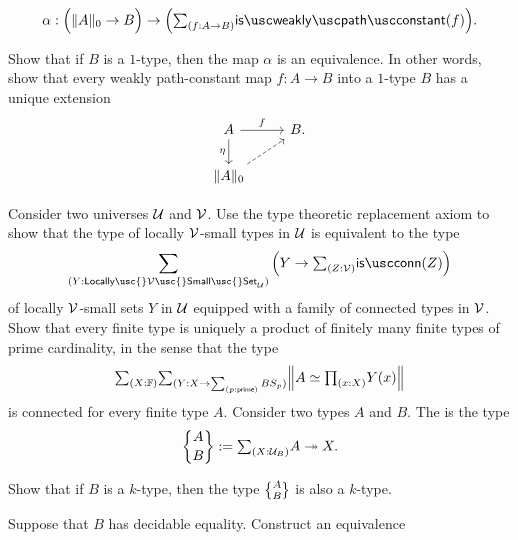 \begin{exercises}
\begin{subexenum}
    \begin{equation*}
      \alpha : \Big(\trunc{0}{A}\to B\Big)\to\Big(\sm{f:A\to B}\isweaklypathconstant(f)\Big).
    \end{equation*}
  \item Show that if $B$ is a $1$-type, then the map $\alpha$ is an equivalence. In other words, show that every weakly path-constant map $f:A\to B$ into a $1$-type $B$ has a unique extension
    \begin{equation*}
      \begin{tikzcd}
        A \arrow[r,"f"] \arrow[d,swap,"\eta"] & B. \\
        \trunc{0}{A} \arrow[ur,dashed]
      \end{tikzcd}
    \end{equation*}
  \end{subexenum}
  \exitem Consider two universes $\mathcal{U}$ and $\mathcal{V}$. Use the type theoretic replacement axiom to show that the type of locally $\mathcal{V}$-small types in $\mathcal{U}$ is equivalent to the type
  \begin{equation*}
    \sum_{(Y:\mathsf{Locally\usc{}}\VV\mathsf{\usc{}Small\usc{}Set}_\UU)}\Big(Y\to \sm{Z:\VV}\isconn(Z)\Big)
  \end{equation*}
  of locally $\mathcal{V}$-small sets $Y$ in $\mathcal{U}$ equipped with a family of connected types in $\mathcal{V}$.
  \exitem Show that every finite type is uniquely a product of finitely many finite types of prime cardinality, in the sense that the type
  \begin{equation*}
    \sm{X:\F}\sm{Y:X\to\sm{p:\primeN}\BS_p}\Brck{A\simeq\prd{x:X}Y(x)}
  \end{equation*}
  is connected for every finite type $A$.
  \exitem \label{ex:stirling-type-of-the-second-kind}Consider two types $A$ and $B$. The  is the type
  \begin{equation*}
    \stirling{A}{B}:=\sm{X:\UU_B}A\twoheadrightarrow X. 
  \end{equation*}
  \begin{subexenum}
  \item Show that if $B$ is a $k$-type, then the type $\stirling{A}{B}$ is also a $k$-type.
  \item Suppose that $B$ has decidable equality. Construct an equivalence

\end{subexenum}
\end{exercises}
